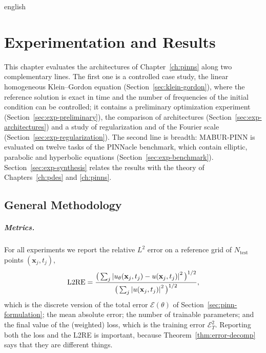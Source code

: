 \documentclass[0000.tex]{subfiles}
\begin{document}

\begin{hyphenrules}{english}

\chapter{Experimentation and Results}\label{ch:experiments}

This chapter evaluates the architectures of Chapter~\ref{ch:pinns} along two complementary lines. The first
one is a controlled case study, the linear homogeneous Klein--Gordon equation (Section~\ref{sec:klein-gordon}),
where the reference solution is exact in time and the number of frequencies of the initial condition can
be controlled; it contains a preliminary optimization experiment (Section~\ref{sec:exp-preliminary}), the
comparison of architectures (Section~\ref{sec:exp-architectures}) and a study of regularization and of the
Fourier scale (Section~\ref{sec:exp-regularization}). The second line is breadth: MABUR-PINN is evaluated on
twelve tasks of the PINNacle benchmark, which contain elliptic, parabolic and hyperbolic equations
(Section~\ref{sec:exp-benchmark}). Section~\ref{sec:exp-synthesis} relates the results with the theory of
Chapters~\ref{ch:pdes} and \ref{ch:pinns}.

\section{General Methodology}\label{sec:exp-methodology}

\paragraph{Metrics.}
For all experiments we report the relative $L^2$ error on a reference grid of
$N_{\mathrm{test}}$ points $(\mathbf{x}_j,t_j)$,
\begin{equation}
  \mathrm{L2RE}=\frac{\big(\sum_j\left\lvert u_\theta(\mathbf{x}_j,t_j)-u(\mathbf{x}_j,t_j) \right\rvert^2\big)^{1/2}}{\big(\sum_j\left\lvert u(\mathbf{x}_j,t_j) \right\rvert^2\big)^{1/2}},
  \label{eq:l2re}
\end{equation}
which is the discrete version of the total error $\mathcal{E}(\theta)$ of Section~\ref{sec:pinn-formulation};
the mean absolute error; the number of trainable parameters; and the final value of the (weighted)
loss, which is the training error $\mathcal{E}_T^2$. Reporting both the loss and the L2RE is important,
because Theorem~\ref{thm:error-decomp} says that they are different things.


\end{hyphenrules}
\end{document}
